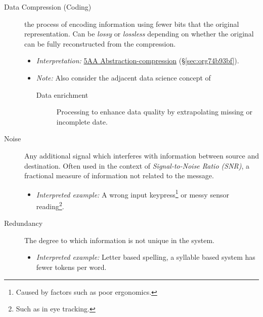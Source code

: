 \documentclass[logo,bsc,singlespacing,parskip]{infthesis}
\begin{document}
{\begin{mdframed}
\begin{description}
\item[{Data Compression (Coding)}] the process of encoding information using fewer bits that the original representation. Can be \emph{lossy} or \emph{lossless} depending on whether the original can be fully reconstructed from the compression.
\begin{itemize}
\item \emph{Interpretation:} \hyperref[sec:org74b93bf]{5AA Abstraction-compression} (\S \ref{sec:org74b93bf}).
\item \emph{Note:} Also consider the adjacent data science concept of
\begin{description}
\item[{Data enrichment}] Processing to enhance data quality by extrapolating missing or incomplete date.
\end{description}
\end{itemize}
\end{description}
\end{mdframed}

\begin{mdframed}
\begin{description}
\item[{Noise\label{noise}}] Any additional signal which interferes with information between source and destination.
Often used in the context of \emph{Signal-to-Noise Ratio (SNR)}, a fractional measure of information not related to the message.
\begin{itemize}
\item \emph{Interpreted example:} A wrong input keypress\footnote{Caused by factors such as poor ergonomics.} or messy sensor reading\footnote{Such as in eye tracking.}.
\end{itemize}
\end{description}
\end{mdframed}

\begin{mdframed}
\begin{description}
\item[{Redundancy}] The degree to which information is not unique in the system.
\begin{itemize}
\item \emph{Interpreted example:} Letter based spelling, a syllable based system has fewer tokens per word.
\end{itemize}
\end{description}
\end{mdframed}

}
\end{document}
